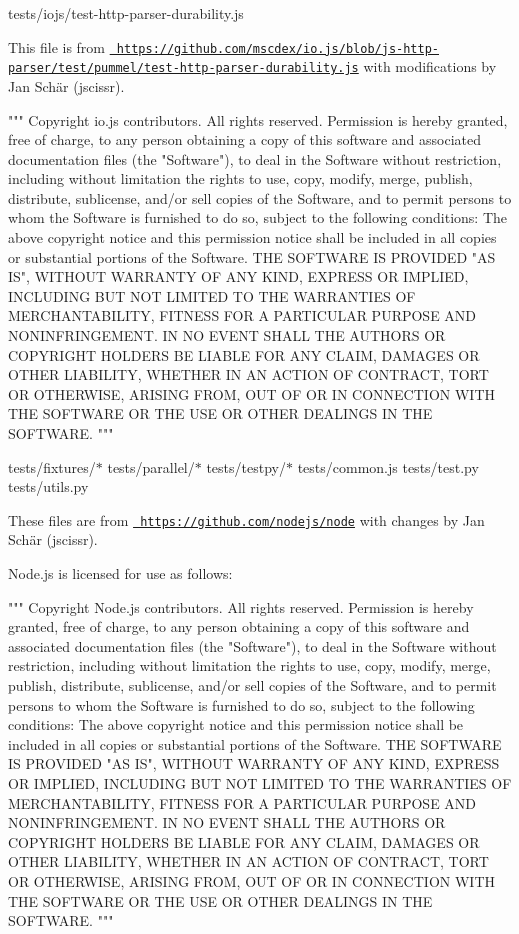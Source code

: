 \begin{DoxyItemize}
\item tests/iojs/test-\/http-\/parser-\/durability.\+js

This file is from \href{https://github.com/mscdex/io.js/blob/js-http-parser/test/pummel/test-http-parser-durability.js}{\texttt{ https\+://github.\+com/mscdex/io.\+js/blob/js-\/http-\/parser/test/pummel/test-\/http-\/parser-\/durability.\+js}} with modifications by Jan Schär (jscissr).

"{}"{}"{}   Copyright io.\+js contributors. All rights reserved.    Permission is hereby granted, free of charge, to any person obtaining a copy   of this software and associated documentation files (the "{}Software"{}), to   deal in the Software without restriction, including without limitation the   rights to use, copy, modify, merge, publish, distribute, sublicense, and/or   sell copies of the Software, and to permit persons to whom the Software is   furnished to do so, subject to the following conditions\+:    The above copyright notice and this permission notice shall be included in   all copies or substantial portions of the Software.    THE SOFTWARE IS PROVIDED "{}AS IS"{}, WITHOUT WARRANTY OF ANY KIND, EXPRESS OR   IMPLIED, INCLUDING BUT NOT LIMITED TO THE WARRANTIES OF MERCHANTABILITY,   FITNESS FOR A PARTICULAR PURPOSE AND NONINFRINGEMENT. IN NO EVENT SHALL THE   AUTHORS OR COPYRIGHT HOLDERS BE LIABLE FOR ANY CLAIM, DAMAGES OR OTHER   LIABILITY, WHETHER IN AN ACTION OF CONTRACT, TORT OR OTHERWISE, ARISING   FROM, OUT OF OR IN CONNECTION WITH THE SOFTWARE OR THE USE OR OTHER DEALINGS   IN THE SOFTWARE.   "{}"{}"{}
\item tests/fixtures/\texorpdfstring{$\ast$}{*} tests/parallel/\texorpdfstring{$\ast$}{*} tests/testpy/\texorpdfstring{$\ast$}{*} tests/common.\+js tests/test.\+py tests/utils.\+py

These files are from \href{https://github.com/nodejs/node}{\texttt{ https\+://github.\+com/nodejs/node}} with changes by Jan Schär (jscissr).

Node.\+js is licensed for use as follows\+:

"{}"{}"{}   Copyright Node.\+js contributors. All rights reserved.    Permission is hereby granted, free of charge, to any person obtaining a copy   of this software and associated documentation files (the "{}Software"{}), to   deal in the Software without restriction, including without limitation the   rights to use, copy, modify, merge, publish, distribute, sublicense, and/or   sell copies of the Software, and to permit persons to whom the Software is   furnished to do so, subject to the following conditions\+:    The above copyright notice and this permission notice shall be included in   all copies or substantial portions of the Software.    THE SOFTWARE IS PROVIDED "{}AS IS"{}, WITHOUT WARRANTY OF ANY KIND, EXPRESS OR   IMPLIED, INCLUDING BUT NOT LIMITED TO THE WARRANTIES OF MERCHANTABILITY,   FITNESS FOR A PARTICULAR PURPOSE AND NONINFRINGEMENT. IN NO EVENT SHALL THE   AUTHORS OR COPYRIGHT HOLDERS BE LIABLE FOR ANY CLAIM, DAMAGES OR OTHER   LIABILITY, WHETHER IN AN ACTION OF CONTRACT, TORT OR OTHERWISE, ARISING   FROM, OUT OF OR IN CONNECTION WITH THE SOFTWARE OR THE USE OR OTHER DEALINGS   IN THE SOFTWARE.   "{}"{}"{}


\end{DoxyItemize}
